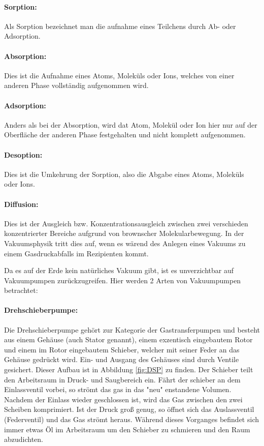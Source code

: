 \paragraph{Sorption:}
Als Sorption bezeichnet man die aufnahme eines Teilchens durch Ab- oder Adsorption.

\paragraph{Absorption:}
Dies ist die Aufnahme eines Atoms, Moleküls oder Ions, welches von einer anderen Phase vollständig
aufgenommen wird.

\paragraph{Adsorption:}
Anders als bei der Absorption, wird dat Atom, Molekül oder Ion hier nur auf der Oberfläche der anderen Phase
festgehalten und nicht komplett aufgenommen.

\paragraph{Desoption:}
Dies ist die Umkehrung der Sorption, also die Abgabe eines Atoms, Moleküls oder Ions.

 \paragraph{Diffusion:}
 Dies ist der Ausgleich bzw. Konzentrationsausgleich zwischen zwei verschieden konzentrierter Bereiche
 aufgrund von brownscher Molekularbewegung. In der Vakuumsphysik tritt dies auf, wenn es wärend des Anlegen eines
 Vakuums zu einem Gasdruckabfalls im Rezipienten kommt.

 Da es auf der Erde kein natürliches Vakuum gibt, ist es unverzichtbar auf Vakuumpumpen zurückzugreifen. Hier werden
 2 Arten von Vakuumpumpen betrachtet:

 \paragraph{Drehschieberpumpe:}
 Die Drehschieberpumpe gehört zur Kategorie der Gastransferpumpen und besteht aus einem Gehäuse (auch Stator genannt), einem
 exzentisch eingebautem Rotor und einem im Rotor eingebautem Schieber, welcher mit seiner Feder an das Gehäuse gedrückt wird.
 Ein- und Ausgang des Gehäuses sind durch Ventile gesichert. Dieser Aufbau ist in Abbildung \ref{fig:DSP} zu finden.
 Der Schieber teilt den Arbeitsraum in Druck- und Saugbereich ein. Fährt der schieber an dem Einlassventil vorbei, so strömt
 das gas in das "neu" enstandene Volumen. Nachdem der Einlass wieder geschlossen ist, wird das Gas zwischen den zwei Scheiben komprimiert.
 Ist der Druck groß genug, so öffnet sich das Auslassventil (Federventil) und das Gas strömt heraus. Während dieses Vorganges
 befindet sich immer etwas Öl im Arbeitsraum um den Schieber zu schmieren und den Raum abzudichten.

